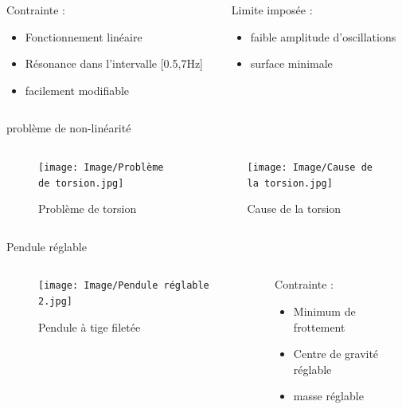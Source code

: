 \documentclass{beamer}
\begin{document}
\begin{frame}
	\begin{columns}
		\begin{column}{0.5\textwidth}
			
		
	
	Contrainte : 
	\begin{itemize}
		\item Fonctionnement linéaire 
		\item Résonance dans l'intervalle [0.5,7Hz]
		\item facilement modifiable
	\end{itemize}
\end{column}
\begin{column}{0.5\textwidth}
	Limite imposée : 
	\begin{itemize}
		\item faible amplitude d'oscillations
		\item surface minimale
	\end{itemize}

\end{column}
\end{columns}
\end{frame}
\begin{frame}{problème de non-linéarité}
	\begin{columns}
		\begin{column}{0.35\textwidth}
			\begin{figure}
				
			
			\texttt{[image: Image/Problème de torsion.jpg]}
			\caption{Problème de torsion}
		\end{figure}
		\end{column}
		\begin{column}{0.35\textwidth}
			\begin{figure}
				\texttt{[image: Image/Cause de la torsion.jpg]}
				\caption{Cause de la torsion}
			\end{figure}
		\end{column}
	\end{columns}
\end{frame}
\begin{frame}{Pendule réglable}
	\begin{columns}
		
	\begin{column}{0.35\textwidth}
		
	
	\begin{figure}
		\texttt{[image: Image/Pendule réglable 2.jpg]}
		\caption{Pendule à tige filetée}
	\end{figure}
\end{column}
\begin{column}{0.65\textwidth}
	Contrainte : 
	\begin{itemize}
		\item Minimum de frottement
		\item Centre de gravité réglable
		\item masse réglable
	\end{itemize}
\end{column}
\end{columns}
\end{frame}
\end{document}

